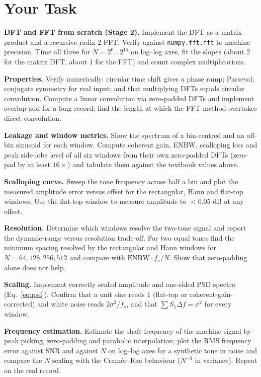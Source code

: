 \documentclass[11pt,a4paper]{article}
\begin{document}
\section*{Your Task}
\begin{tasks}
  \item \textbf{DFT and FFT from scratch (Stage 2).} Implement the DFT as a matrix product and a recursive radix-2 FFT. Verify against \texttt{numpy.fft.fft} to machine precision. Time all three for $N=2^6\ldots2^{14}$ on log--log axes, fit the slopes (about 2 for the matrix DFT, about 1 for the FFT) and count complex multiplications.
  \item \textbf{Properties.} Verify numerically: circular time shift gives a phase ramp; Parseval; conjugate symmetry for real input; and that multiplying DFTs equals circular convolution. Compute a linear convolution via zero-padded DFTs and implement overlap-add for a long record; find the length at which the FFT method overtakes direct convolution.
  \item \textbf{Leakage and window metrics.} Show the spectrum of a bin-centred and an off-bin sinusoid for each window. Compute coherent gain, ENBW, scalloping loss and peak side-lobe level of all six windows from their own zero-padded DFTs (zero-pad by at least $16\times$) and tabulate them against the textbook values above.
  \item \textbf{Scalloping curve.} Sweep the tone frequency across half a bin and plot the measured amplitude error versus offset for the rectangular, Hann and flat-top windows. Use the flat-top window to measure amplitude to $<0.05$ dB at any offset.
  \item \textbf{Resolution.} Determine which windows resolve the two-tone signal and report the dynamic-range versus resolution trade-off. For two equal tones find the minimum spacing resolved by the rectangular and Hann windows for $N=64,128,256,512$ and compare with $\mathrm{ENBW}\cdot f_s/N$. Show that zero-padding alone does not help.
  \item \textbf{Scaling.} Implement correctly scaled amplitude and one-sided PSD spectra (Eq.~\eqref{eq:psd}). Confirm that a unit sine reads $1$ (flat-top or coherent-gain-corrected) and white noise reads $2\sigma^2/f_s$, and that $\sum S_1\Delta f=\sigma^2$ for every window.
  \item \textbf{Frequency estimation.} Estimate the shaft frequency of the machine signal by peak picking, zero-padding and parabolic interpolation; plot the RMS frequency error against SNR and against $N$ on log--log axes for a synthetic tone in noise and compare the $N$ scaling with the Cram\'er--Rao behaviour ($N^{-3}$ in variance). Repeat on the real record.
\end{tasks}
\end{document}
